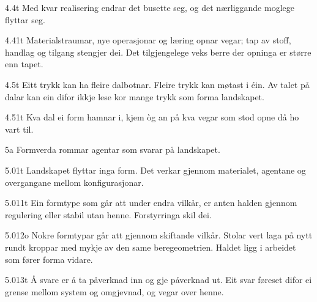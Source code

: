 \begin{formproposition}{4.4}{t}
Med kvar realisering endrar det busette seg, og det nærliggande moglege flyttar seg.
\end{formproposition}

\begin{formproposition}{4.41}{t}
Materialstraumar, nye operasjonar og læring opnar vegar; tap av stoff, handlag og tilgang stengjer dei. Det tilgjengelege veks berre der opninga er større enn tapet.
\end{formproposition}

\begin{formproposition}{4.5}{t}
Eitt trykk kan ha fleire dalbotnar. Fleire trykk kan møtast i éin. Av talet på dalar kan ein difor ikkje lese kor mange trykk som forma landskapet.
\end{formproposition}

\begin{formproposition}{4.51}{t}
Kva dal ei form hamnar i, kjem òg an på kva vegar som stod opne då ho vart til.
\end{formproposition}

\begin{formproposition}{5}{a}
Formverda rommar agentar som svarar på landskapet.
\end{formproposition}

\begin{formproposition}{5.01}{t}
Landskapet flyttar inga form. Det verkar gjennom materialet, agentane og overgangane mellom konfigurasjonar.
\end{formproposition}

\begin{formproposition}{5.011}{t}
Ein formtype som går att under endra vilkår, er anten halden gjennom regulering eller stabil utan henne. Forstyrringa skil dei.
\end{formproposition}

\begin{formproposition}{5.012}{o}
Nokre formtypar går att gjennom skiftande vilkår. Stolar vert laga på nytt rundt kroppar med mykje av den same beregeometrien. Haldet ligg i arbeidet som fører forma vidare.
\end{formproposition}

\begin{formproposition}{5.013}{t}
Å svare er å ta påverknad inn og gje påverknad ut. Eit svar føreset difor ei grense mellom system og omgjevnad, og vegar over henne.
\end{formproposition}

